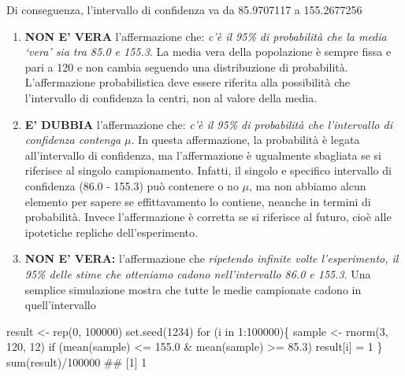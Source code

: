 \documentclass[a4paper,12pt,oneside]{book}
\providecommand{\tightlist}{%
  \setlength{\itemsep}{0pt}\setlength{\parskip}{0pt}}
\newenvironment{Shaded}{}{}
\newcommand{\KeywordTok}[1]{#1}
\newcommand{\DecValTok}[1]{#1}
\newcommand{\FloatTok}[1]{#1}
\newcommand{\StringTok}[1]{#1}
\newcommand{\CommentTok}[1]{#1}
\newcommand{\ControlFlowTok}[1]{#1}
\newcommand{\OperatorTok}[1]{#1}
\newcommand{\NormalTok}[1]{#1}
\begin{document}
Di conseguenza, l'intervallo di confidenza va da 85.9707117 a 155.2677256

\begin{enumerate}
\def\labelenumi{\arabic{enumi}.}
\tightlist
\item
  \textbf{NON E' VERA} l'affermazione che: \emph{c'è il 95\% di probabilità che la media `vera' sia tra 85.0 e 155.3}. La media vera della popolazione è sempre fissa e pari a 120 e non cambia seguendo una distribuzione di probabilità. L'affermazione probabilistica deve essere riferita alla possibilità che l'intervallo di confidenza la centri, non al valore della media.
\item
  \textbf{E' DUBBIA} l'affermazione che: \emph{c'è il 95\% di probabilità che l'intervallo di confidenza contenga \(\mu\)}. In questa affermazione, la probabilità è legata all'intervallo di confidenza, ma l'affermazione è ugualmente sbagliata se si riferisce al singolo campionamento. Infatti, il singolo e specifico intervallo di confidenza (86.0 - 155.3) può contenere o no \(\mu\), ma non abbiamo alcun elemento per sapere se effittavamento lo contiene, neanche in termini di probabilità. Invece l'affermazione è corretta se si riferisce al futuro, cioè alle ipotetiche repliche dell'esperimento.
\item
  \textbf{NON E' VERA:} l'affermazione che \emph{ripetendo infinite volte l'esperimento, il 95\% delle stime che otteniamo cadono nell'intervallo 86.0 e 155.3}. Una semplice simulazione mostra che tutte le medie campionate cadono in quell'intervallo
\end{enumerate}

\begin{Shaded}
\begin{Highlighting}[]
\NormalTok{result <-}\StringTok{ }\KeywordTok{rep}\NormalTok{(}\DecValTok{0}\NormalTok{, }\DecValTok{100000}\NormalTok{)}
\KeywordTok{set.seed}\NormalTok{(}\DecValTok{1234}\NormalTok{)}
\ControlFlowTok{for}\NormalTok{ (i }\ControlFlowTok{in} \DecValTok{1}\OperatorTok{:}\DecValTok{100000}\NormalTok{)\{}
\NormalTok{  sample <-}\StringTok{ }\KeywordTok{rnorm}\NormalTok{(}\DecValTok{3}\NormalTok{, }\DecValTok{120}\NormalTok{, }\DecValTok{12}\NormalTok{)}
  \ControlFlowTok{if}\NormalTok{ (}\KeywordTok{mean}\NormalTok{(sample) }\OperatorTok{<=}\StringTok{ }\FloatTok{155.0} \OperatorTok{&}\StringTok{ }\KeywordTok{mean}\NormalTok{(sample) }\OperatorTok{>=}\StringTok{ }\FloatTok{85.3}\NormalTok{) result[i] =}\StringTok{ }\DecValTok{1}
\NormalTok{\}}
\KeywordTok{sum}\NormalTok{(result)}\OperatorTok{/}\DecValTok{100000}
\CommentTok{## [1] 1}
\end{Highlighting}
\end{Shaded}
\end{document}
